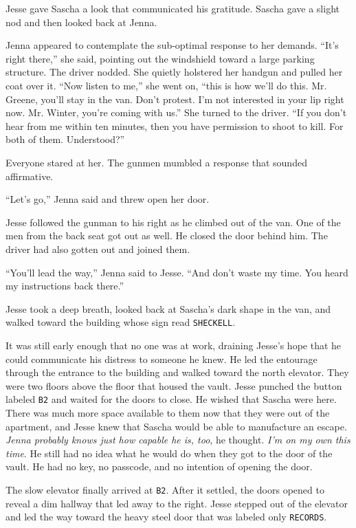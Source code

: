 \documentclass[12pt]{book}
\begin{document}
Jesse gave Sascha a look that communicated his gratitude.  Sascha gave a slight nod and then looked back at Jenna.

Jenna appeared to contemplate the sub-optimal response to her demands.  ``It's right there,'' she said, pointing out the windshield toward a large parking structure.  The driver nodded.  She quietly holstered her handgun and pulled her coat over it.  ``Now listen to me,'' she went on, ``this is how we'll do this.  Mr. Greene, you'll stay in the van.  Don't protest.  I'm not interested in your lip right now.  Mr. Winter, you're coming with us.''  She turned to the driver.  ``If you don't hear from me within ten minutes, then you have permission to shoot to kill.  For both of them.  Understood?''

Everyone stared at her.  The gunmen mumbled a response that sounded affirmative.

``Let's go,'' Jenna said and threw open her door.

Jesse followed the gunman to his right as he climbed out of the van.  One of the men from the back seat got out as well.  He closed the door behind him.  The driver had also gotten out and joined them.

``You'll lead the way,'' Jenna said to Jesse.  ``And don't waste my time.  You heard my instructions back there.''

Jesse took a deep breath, looked back at Sascha's dark shape in the van, and walked toward the building whose sign read \texttt{SHECKELL}.

It was still early enough that no one was at work, draining Jesse's hope that he could communicate his distress to someone he knew.  He led the entourage through the entrance to the building and walked toward the north elevator.  They were two floors above the floor that housed the vault.  Jesse punched the button labeled \texttt{B2} and waited for the doors to close.  He wished that Sascha were here.  There was much more space available to them now that they were out of the apartment, and Jesse knew that Sascha would be able to manufacture an escape.  \emph{Jenna probably knows just how capable he is, too}, he thought.  \emph{I'm on my own this time}.  He still had no idea what he would do when they got to the door of the vault.  He had no key, no passcode, and no intention of opening the door.

The slow elevator finally arrived at \texttt{B2}.  After it settled, the doors opened to reveal a dim hallway that led away to the right.  Jesse stepped out of the elevator and led the way toward the heavy steel door that was labeled only \texttt{RECORDS}.
\end{document}
